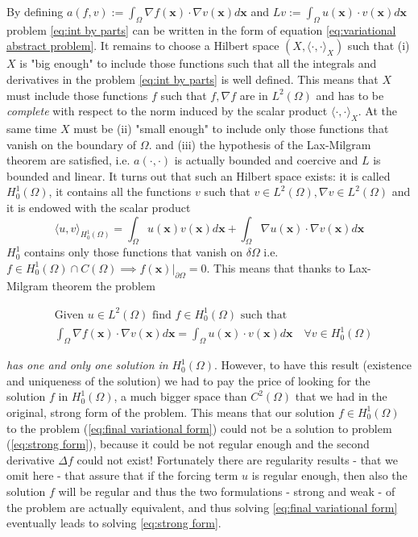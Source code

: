 By defining $a(f, v):=	\int_\Omega \nabla f(\mathbf x)\cdot\nabla v(\mathbf x) d\mathbf x $ and $Lv := \int_\Omega  u(\mathbf x)\cdot v(\mathbf x)d\mathbf x$ problem \ref{eq:int by parts} can be written in the form of equation \ref{eq:variational abstract problem}. It remains to choose a Hilbert space $(X, \langle\cdot,\cdot\rangle_X)$ such that (i) $X$ is "big enough" to include those functions such that all the integrals and derivatives in the problem \ref{eq:int by parts} is well defined. This means that $X$ must include those functions $f$ such that $f, \nabla f$ are in $L^2(\Omega)$ and has to be \textit{complete} with respect to the norm induced by the scalar product $\langle\cdot,\cdot\rangle_X$. At the same time $X$ must be (ii) "small enough" to include only those functions that vanish on the boundary of $\Omega$. and (iii) the hypothesis of the Lax-Milgram theorem are satisfied, i.e. $a(\cdot, \cdot)$ is actually bounded and coercive and $L$ is bounded and linear. It turns out that such an Hilbert space exists: it is called $H^1_0(\Omega)$, it contains all the functions $v$ such that $v\in L^2(\Omega), \nabla v\in L^2(\Omega)$ and it is endowed with the scalar product 
$$
\langle u, v\rangle_{H^1_0(\Omega)} = \int_\Omega u(\mathbf x)v(\mathbf x)d\mathbf x + \int_\Omega\nabla u(\mathbf x)\cdot \nabla v(\mathbf x) d\mathbf x
$$
$H^1_0$ contains only those functions that vanish on $\delta \Omega$ i.e. \\$f\in H^1_0(\Omega)\cap C(\Omega) \implies \left.f(\mathbf x)\right|_{\partial\Omega}=0$. This means that thanks to Lax-Milgram theorem the problem

\begin{equation}\label{eq:final variational form}
\begin{split}
	&\text{Given }u\in L^2(\Omega)\text{ find }f\in H^1_0(\Omega)\text{ such that }\\
	&\int_\Omega \nabla f(\mathbf x)\cdot\nabla v(\mathbf x) d\mathbf x = \int_\Omega  u(\mathbf x)\cdot v(\mathbf x)d\mathbf x\quad \forall v\in H^1_0(\Omega)
\end{split}
\end{equation}

\textit{has one and only one solution in} $H^1_0(\Omega)$. However, to have this result (existence and uniqueness of the solution) we had to pay the price of looking for the solution $f$ in $H^1_0(\Omega)$, a much bigger space than  $C^2(\Omega)$ that we had in the original, strong form of the problem. This means that our solution $f\in H^1_0(\Omega)$ to the problem (\ref{eq:final variational form}) could not be a solution to problem (\ref{eq:strong form}), because it could be not regular enough and the second derivative $\Delta f$ could not exist! Fortunately there are regularity results - that we omit here - that assure that if the forcing term $u$ is regular enough, then also the solution $f$ will be regular and thus the two formulations - strong and weak - of the problem are actually equivalent, and thus solving \ref{eq:final variational form} eventually leads to solving \ref{eq:strong form}.


